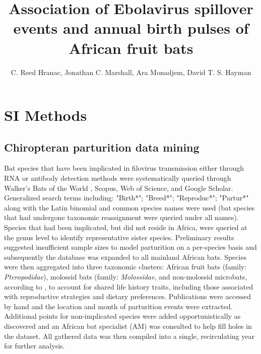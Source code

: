 \documentclass[9pt,twoside,lineno]{pnas-new}
\title{Association of Ebolavirus spillover events and annual birth pulses of African fruit bats}
\author{C. Reed Hranac, Jonathan C. Marshall, Ara Monadjem, David T. S. Hayman}
\begin{document}

\maketitle

\SItext


\section*{SI Methods}
\label{SI methods}

\subsection*{Chiropteran parturition data mining}
\label{dataMining}
Bat species that have been implicated in filovirus transmission either through RNA or antibody detection methods \cite{Han2016UndiscoveredFiloviruses,Walsh2005Wave-likeZaire} were systematically queried through Walker's Bats of the World \cite{Nowak1994WalkersWorld}, Scopus, Web of Science, and Google Scholar. Generalized search terms including: "Birth*"; "Breed*"; "Reproduc*"; "Partur*" along with the Latin binomial and common species names were used (bat species that had undergone taxonomic reassignment were queried under all names). Species that had been implicated, but did not reside in Africa, were queried at the genus level to identify representative sister species. Preliminary results suggested insufficient sample sizes to model parturition on a per-species basis and subsequently the database was expanded to all mainland African bats. Species were then aggregated into three taxonomic clusters: African fruit bats (family: \textit{Pteropodidae}), molossid bats (family: \textit{Molossidae}, and non-molossid microbats, according to \cite{Cumming1997RainfallBats}, to account for shared life history traits, including those associated with reproductive strategies and dietary preferences. Publications were accessed by hand and the location and month of parturition events were extracted. Additional points for non-implicated species were added opportunistically as discovered and an African bat specialist (AM) was consulted to help fill holes in the dataset. All gathered data was then compiled into a single, recirculating year for further analysis.\par
\end{document}
